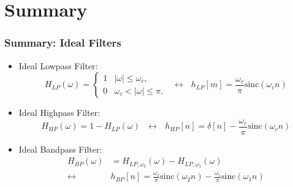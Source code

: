 \documentclass{beamer}
\begin{document}
\section[Summary]{Summary}
\setcounter{subsection}{1}

\begin{frame}
  \frametitle{Summary: Ideal Filters}
  \begin{itemize}
  \item Ideal Lowpass Filter:
    \[
    H_{LP}(\omega)
    = \begin{cases} 1& |\omega|\le\omega_c,\\
      0 & \omega_c<|\omega|\le\pi.
    \end{cases}~~~\leftrightarrow~~~
    h_{LP}[m]=\frac{\omega_c}{\pi}\mbox{sinc}(\omega_c n)
    \]
  \item Ideal Highpass Filter:
    \[
    H_{HP}(\omega)=1-H_{LP}(\omega)~~~\leftrightarrow~~~
    h_{HP}[n]=\delta[n]-\frac{\omega_c}{\pi}\mbox{sinc}(\omega_c n)
    \]
  \item Ideal Bandpass Filter:
    \begin{align*}
      H_{BP}(\omega)&=H_{LP,\omega_2}(\omega)-H_{LP,\omega_1}(\omega)\\
      \leftrightarrow
      &h_{BP}[n]=\frac{\omega_2}{\pi}\mbox{sinc}(\omega_2 n)-\frac{\omega_1}{\pi}\mbox{sinc}(\omega_1 n)
    \end{align*}
  \end{itemize}
\end{frame}
\end{document}
